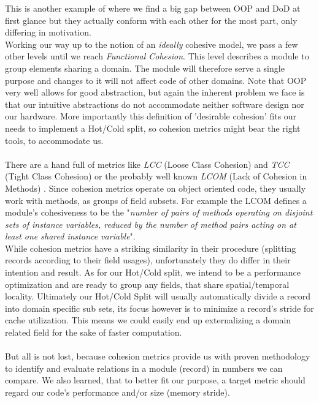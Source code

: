 This is another example of where we find a big gap between OOP and DoD at first glance but they actually conform with each other for the most part, only differing in motivation.\\
Working our way up to the notion of an \textit{ideally} cohesive model, we pass a few other levels until we reach \textit{Functional Cohesion}. This level describes a module to group elements sharing a domain. The module will therefore serve a single purpose and changes to it will not affect code of other domains. Note that OOP very well allows for good abstraction, but again the inherent problem we face is that our intuitive abstractions do not accommodate neither software design nor our hardware. More importantly this definition of 'desirable cohesion' fits our needs to implement a Hot/Cold split, so cohesion metrics might bear the right tools, to accommodate us.\\\\
There are a hand full of metrics like \textit{LCC} (Loose Class Cohesion)  and  \textit{TCC}  (Tight  Class  Cohesion) or the probably well known \textit{LCOM} (Lack of Cohesion in Methods) . Since cohesion metrics operate on object oriented code, they usually work with methods, as groups of field subsets. For example the LCOM defines a module's cohesiveness to be the "\textit{number of pairs of methods operating on disjoint sets of instance variables, reduced by the number of method pairs acting on at least one shared instance variable}".\\
While cohesion metrics have a striking similarity in their procedure (splitting records according to their field usages), unfortunately they do differ in their intention and result. As for our Hot/Cold split, we intend to be a performance optimization and are ready to group any fields, that share spatial/temporal locality. Ultimately our Hot/Cold Split will usually automatically divide a record into domain specific sub sets, its focus however is to minimize a record's stride for cache utilization. This means we could easily end up externalizing a domain related field for the sake of faster computation.\\\\
But all is not lost, because cohesion metrics provide us with proven methodology to identify and evaluate relations in a module (record) in numbers we can compare. We also learned, that to better fit our purpose, a target metric should regard our code's performance and/or size (memory stride). 

